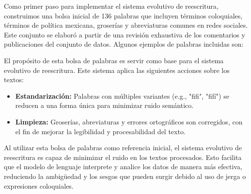 \documentclass[10pt, a4paper]{article}
\begin{document}
	
	Como primer paso para implementar el sistema evolutivo de reescritura, construimos una bolsa inicial de 136 palabras que incluyen términos coloquiales, términos de política mexicana, groserías y abreviaturas comunes en redes sociales. Este conjunto se elaboró a partir de una revisión exhaustiva de los comentarios y publicaciones del conjunto de datos. Algunos ejemplos de palabras incluidas son:
	
	\begin{table}[H]
		\centering
		\caption{Ejemplo de palabras incluidas en la bolsa inicial.}
		\label{tab:bolsa_palabras}
	\end{table}
	
	
	El propósito de esta bolsa de palabras es servir como base para el sistema evolutivo de reescritura. Este sistema aplica las siguientes acciones sobre los textos:
	\begin{itemize}
		\item \textbf{Estandarización:} Palabras con múltiples variantes (e.g., "fifi", "fifí") se reducen a una forma única para minimizar ruido semántico.
		\item \textbf{Limpieza:} Groserías, abreviaturas y errores ortográficos son corregidos, con el fin de mejorar la legibilidad y procesabilidad del texto.
	\end{itemize}
	
	Al utilizar esta bolsa de palabras como referencia inicial, el sistema evolutivo de reescritura es capaz de minimizar el ruido en los textos procesados. Esto facilita que el modelo de lenguaje interprete y analice los datos de manera más efectiva, reduciendo la ambigüedad y los sesgos que pueden surgir debido al uso de jerga o expresiones coloquiales.
	
\end{document}
